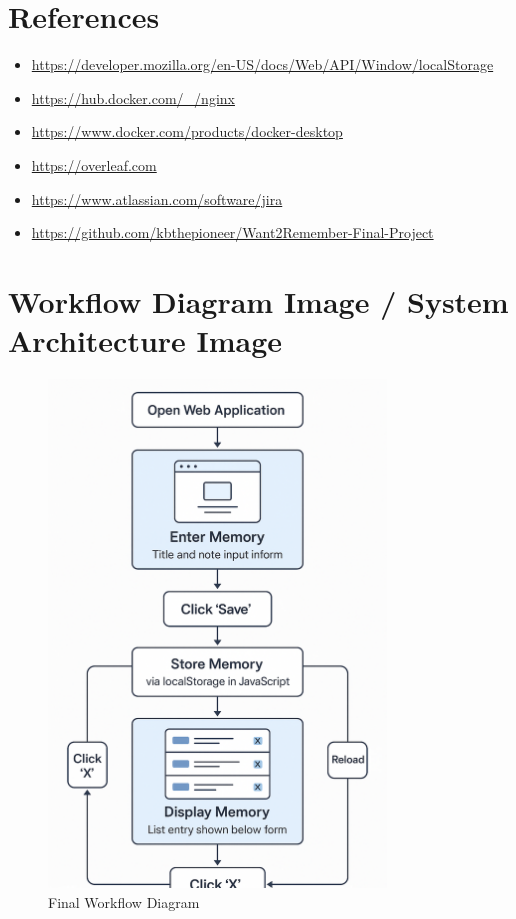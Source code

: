 \documentclass[12pt]{article}
\begin{document}
\section{References}
\begin{itemize}
  \item \url{https://developer.mozilla.org/en-US/docs/Web/API/Window/localStorage}
  \item \url{https://hub.docker.com/_/nginx}
  \item \url{https://www.docker.com/products/docker-desktop}
  \item \url{https://overleaf.com}
  \item \url{https://www.atlassian.com/software/jira}
  \item \url{https://github.com/kbthepioneer/Want2Remember-Final-Project}
\end{itemize}

\section{Workflow Diagram Image / System Architecture Image}

\begin{figure}[h!]
\centering
\includegraphics[width=0.8\textwidth]{workflow_diagram_FINAL.png}
\caption{Final Workflow Diagram}
\end{figure}
\end{document}
